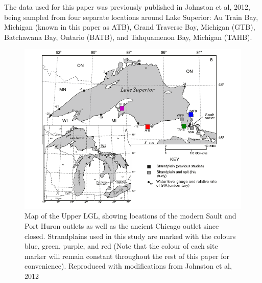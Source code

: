 \documentclass{article}
\begin{document}
\newpage 
 
 The data used for this paper was previously published in
 Johnston et al, 2012, being sampled from four separate locations around
  Lake Superior:
 Au Train Bay, Michigan (known in this paper as ATB), Grand Traverse Bay,
 Michigan (GTB), Batchawana Bay, Ontario (BATB), and 
 Tahquamenon Bay, Michigan (TAHB).\\
 \begin{figure}[h]
	\includegraphics[width=0.8\linewidth]{johnstonLaurentianMapWithSites.png}
	\caption{Map of the Upper LGL, showing locations of the modern Sault and Port Huron
	outlets as well as the ancient Chicago outlet since closed. Strandplains used
	in this study are marked with the colours blue, green, purple, and red (Note that
	 the colour of each site marker will remain constant throughout the rest of
	 this paper for convenience). Reproduced with modifications from Johnston et al, 2012}
	\label{fig:johnstonLaurentianMapWithSites}
 \end{figure}
\end{document}
